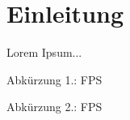 \documentclass[../Document.tex]{subfiles}
\begin{document}
\section{Einleitung}
Lorem Ipsum...

Abkürzung 1.:
\ac{FPS}

Abkürzung 2.:
\ac{FPS}
\end{document}
